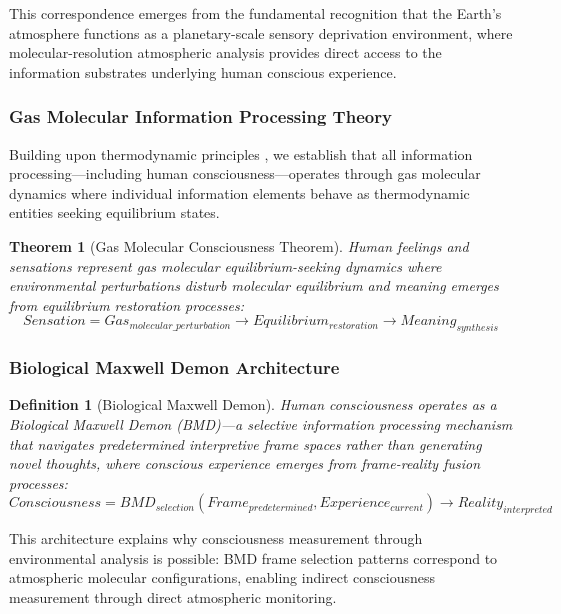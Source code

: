\documentclass[12pt,a4paper]{article}
\newtheorem{theorem}{Theorem}
\newtheorem{definition}{Definition}
\begin{document}
This correspondence emerges from the fundamental recognition that the Earth's atmosphere functions as a planetary-scale sensory deprivation environment, where molecular-resolution atmospheric analysis provides direct access to the information substrates underlying human conscious experience.

\subsubsection{Gas Molecular Information Processing Theory}

Building upon thermodynamic principles \citep{landauer1961irreversibility, bennett1982thermodynamics}, we establish that all information processing—including human consciousness—operates through gas molecular dynamics where individual information elements behave as thermodynamic entities seeking equilibrium states.

\begin{theorem}[Gas Molecular Consciousness Theorem]
Human feelings and sensations represent gas molecular equilibrium-seeking dynamics where environmental perturbations disturb molecular equilibrium and meaning emerges from equilibrium restoration processes:
\begin{equation}
Sensation = Gas_{molecular\_perturbation} \rightarrow Equilibrium_{restoration} \rightarrow Meaning_{synthesis}
\end{equation}
\end{theorem}

\subsubsection{Biological Maxwell Demon Architecture}

\begin{definition}[Biological Maxwell Demon]
Human consciousness operates as a Biological Maxwell Demon (BMD)—a selective information processing mechanism that navigates predetermined interpretive frame spaces rather than generating novel thoughts, where conscious experience emerges from frame-reality fusion processes:
\begin{equation}
Consciousness = BMD_{selection}(Frame_{predetermined}, Experience_{current}) \rightarrow Reality_{interpreted}
\end{equation}
\end{definition}

This architecture explains why consciousness measurement through environmental analysis is possible: BMD frame selection patterns correspond to atmospheric molecular configurations, enabling indirect consciousness measurement through direct atmospheric monitoring.
\end{document}
